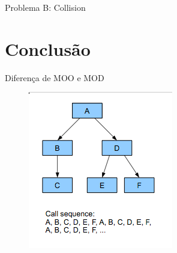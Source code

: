 \documentclass{beamer}
\begin{document}
\begin{frame}[t]{Problema B: Collision}
\end{frame}

\section{Conclusão}

\frame{\tableofcontents[currentsection]}

\begin{frame}[t]{Diferença de MOO e MOD}
    \begin{figure}
    \centering
        \begin{minipage}[b]{0.35\textwidth}
            \includegraphics[width=\textwidth]{figuras/objectreadingorder}
        \end{minipage}
        \begin{minipage}[b]{0.35\textwidth}

\end{minipage}
\end{figure}
\end{frame}
\end{document}

